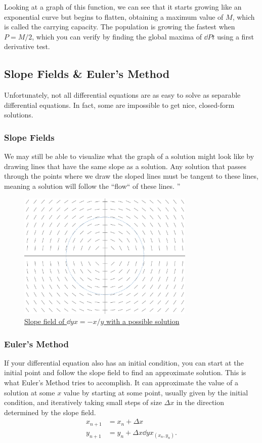 Looking at a graph of this function, we can see that it starts growing like an exponential curve but begins to flatten, obtaining a maximum value of $M$, which is called the carrying capacity.
The population is growing the fastest when $P=M/2$, which you can verify by finding the global maxima of $\dd{P}{t}$ using a first derivative test.

\subsection{Slope Fields \& Euler's Method}
Unfortunately, not all differential equations are as easy to solve as separable differential equations.
In fact, some are impossible to get nice, closed-form solutions.
\subsubsection{Slope Fields}
We may still be able to visualize what the graph of a solution might look like by drawing lines that have the same slope as a solution.
Any solution that passes through the points where we draw the sloped lines must be tangent to these lines, meaning a solution will follow the ``flow`` of these lines.
''
\begin{figure}[H]
	\label{slope_field}
	\centering
	\includegraphics[width=0.75\textwidth]{./applications_integrals/slope_field.png}
	\caption{\hyperref{}{}{}{Slope field of $\dd{y}{x}=-x/y$ with a possible solution}}
\end{figure}

\subsubsection{Euler's Method}
If your differential equation also has an initial condition, you can start at the initial point and follow the slope field to find an approximate solution.
This is what Euler's Method tries to accomplish.
It can approximate the value of a solution at some $x$ value by starting at some point, usually given by the initial condition, and iteratively taking small steps of size $\Delta x$ in the direction determined by the slope field.
\begin{align*}
	x_{n+1} &= x_n + \Delta x \\
	y_{n+1} &= y_n + \Delta x\dd{y}{x}_{(x_n,y_n)}.
\end{align*}

